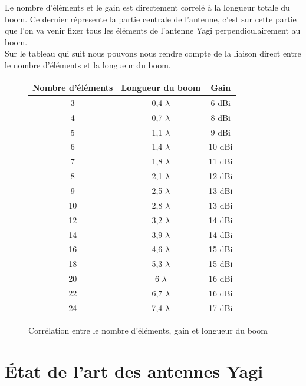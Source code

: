 \documentclass[12pt, a4paper]{article}
\begin{document}
\newpage
Le nombre d'éléments et le gain est directement correlé 
à la longueur totale du boom. Ce dernier répresente la partie
centrale de l'antenne, c'est sur cette partie que l'on va venir
fixer tous les éléments de l'antenne Yagi perpendiculairement au boom.\\

Sur le tableau qui suit nous pouvons nous rendre compte
de la liaison direct entre le nombre d'éléments et la longueur
du boom.\\

\begin{figure}[h]
    \centering
    \begin{tabular}{|c|c|c|}
        \hline
        Nombre d'éléments & Longueur du boom & Gain \\
        \hline
        3 & 0,4 $\lambda$ & 6 dBi \\
        \hline
        4 & 0,7 $\lambda$ & 8 dBi \\
        \hline
        5 & 1,1 $\lambda$ & 9 dBi \\
        \hline
        6 & 1,4 $\lambda$ & 10 dBi \\
        \hline
        7 & 1,8 $\lambda$ & 11 dBi \\
        \hline
        8 & 2,1 $\lambda$ & 12 dBi \\
        \hline
        9 & 2,5 $\lambda$ & 13 dBi \\
        \hline
        10 & 2,8 $\lambda$ & 13 dBi \\
        \hline
        12 & 3,2 $\lambda$ & 14 dBi \\
        \hline
        14 & 3,9 $\lambda$ & 14 dBi \\
        \hline
        16 & 4,6 $\lambda$ & 15 dBi \\
        \hline
        18 & 5,3 $\lambda$ & 15 dBi \\
        \hline
        20 & 6 $\lambda$ & 16 dBi \\
        \hline
        22 & 6,7 $\lambda$ & 16 dBi \\
        \hline
        24 & 7,4 $\lambda$ & 17 dBi \\
        \hline
    \end{tabular}
    \caption{Corrélation entre le nombre d'éléments, gain et longueur du boom \cite{r2}}
    \label{fig:tableau}
\end{figure}


\newpage
\section{État de l'art des antennes Yagi}
\end{document}
